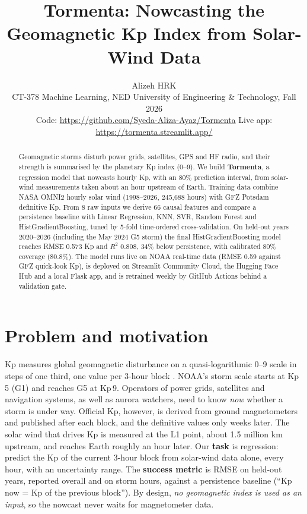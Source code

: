 \documentclass[11pt,a4paper]{article}
\title{\vspace{-1.2em}\textbf{Tormenta: Nowcasting the Geomagnetic Kp Index from Solar-Wind Data}\vspace{-0.4em}}
\author{Alizeh \quad HRK\\[1pt]
\small CT-378 Machine Learning, NED University of Engineering \& Technology, Fall 2026\\[1pt]
\small Code: \url{https://github.com/Syeda-Aliza-Ayaz/Tormenta} \quad Live app: \url{https://tormenta.streamlit.app/}}
\date{\vspace{-1.6em}}
\begin{document}
\maketitle

\begin{abstract}
\noindent Geomagnetic storms disturb power grids, satellites, GPS and HF radio, and their strength is summarised by
the planetary Kp index (0--9). We build \textbf{Tormenta}, a regression model that nowcasts hourly Kp, with an 80\%
prediction interval, from solar-wind measurements taken about an hour upstream of Earth. Training data combine NASA
OMNI2 hourly solar wind (1998--2026, 245{,}688 hours) with GFZ Potsdam definitive Kp. From 8 raw inputs we derive 66
causal features and compare a persistence baseline with Linear Regression, KNN, SVR, Random Forest and
HistGradientBoosting, tuned by 5-fold time-ordered cross-validation. On held-out years 2020--2026 (including the
May 2024 G5 storm) the final HistGradientBoosting model reaches RMSE 0.573 Kp and $R^2$ 0.808, 34\% below
persistence, with calibrated 80\% coverage (80.8\%). The model runs live on NOAA real-time data (RMSE 0.59 against
GFZ quick-look Kp), is deployed on Streamlit Community Cloud, the Hugging Face Hub and a local Flask app, and is
retrained weekly by GitHub Actions behind a validation gate.
\end{abstract}

\section{Problem and motivation}
Kp measures global geomagnetic disturbance on a quasi-logarithmic 0--9 scale in steps of one third, one value per
3-hour block \cite{matzka2021}. NOAA's storm scale starts at Kp\,5 (G1) and reaches G5 at Kp\,9. Operators of power
grids, satellites and navigation systems, as well as aurora watchers, need to know \emph{now} whether a storm is under
way. Official Kp, however, is derived from ground magnetometers and published after each block, and the definitive
values only weeks later. The solar wind that drives Kp is measured at the L1 point, about 1.5 million km upstream, and
reaches Earth roughly an hour later. Our \textbf{task} is regression: predict the Kp of the current 3-hour block from
solar-wind data alone, every hour, with an uncertainty range. The \textbf{success metric} is RMSE on held-out years,
reported overall and on storm hours, against a persistence baseline (``Kp now = Kp of the previous block'').
By design, \emph{no geomagnetic index is used as an input}, so the nowcast never waits for magnetometer data.
\end{document}
